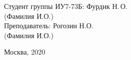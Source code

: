 \begin{titlepage}
	\begin{center}
		\newlength{\ML}
		\hfill Студент группы ИУ7-73Б:\hspace{0.2cm} Фурдик Н.\,О.\\
		\hfill\hspace{1.7cm} (Фамилия И.О.)\\
		\hfill Преподаватель:\hspace{0.2cm} Рогозин Н.О.\\
		\hfill\hspace{1.7cm} (Фамилия И.О.)\\
		
	\end{center}
	
	\vspace{0pt plus4fill} %
	{\centering Москва, 2020\par}
\end{titlepage}